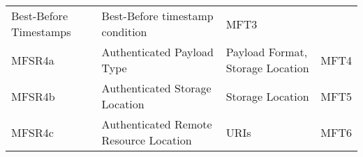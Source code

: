 \documentclass[0-thesis.tex]{subfiles}
\begin{document}
\begin{longtable}[]{@{}llll@{}}
    \begin{minipage}[t]{0.29\columnwidth}\raggedright\strut Best-Before Timestamps\strut
    \end{minipage} & \begin{minipage}[t]{0.34\columnwidth}\raggedright\strut Best-Before
    timestamp condition\strut \end{minipage} &
    \begin{minipage}[t]{0.10\columnwidth}\raggedright\strut MFT3\strut
    \end{minipage}\tabularnewline
    \begin{minipage}[t]{0.16\columnwidth}\raggedright\strut MFSR4a\strut \end{minipage} &
    \begin{minipage}[t]{0.29\columnwidth}\raggedright\strut Authenticated Payload
    Type\strut \end{minipage} & \begin{minipage}[t]{0.34\columnwidth}\raggedright\strut
    Payload Format, Storage Location\strut \end{minipage} &
    \begin{minipage}[t]{0.10\columnwidth}\raggedright\strut MFT4\strut
    \end{minipage}\tabularnewline
    \begin{minipage}[t]{0.16\columnwidth}\raggedright\strut MFSR4b\strut \end{minipage} &
    \begin{minipage}[t]{0.29\columnwidth}\raggedright\strut Authenticated Storage
    Location\strut \end{minipage} &
    \begin{minipage}[t]{0.34\columnwidth}\raggedright\strut Storage Location\strut
    \end{minipage} & \begin{minipage}[t]{0.10\columnwidth}\raggedright\strut MFT5\strut
    \end{minipage}\tabularnewline
    \begin{minipage}[t]{0.16\columnwidth}\raggedright\strut MFSR4c\strut \end{minipage} &
    \begin{minipage}[t]{0.29\columnwidth}\raggedright\strut Authenticated Remote Resource
    Location\strut \end{minipage} &
    \begin{minipage}[t]{0.34\columnwidth}\raggedright\strut URIs\strut \end{minipage} &
    \begin{minipage}[t]{0.10\columnwidth}\raggedright\strut MFT6\strut

\end{minipage}
\end{longtable}
\end{document}

